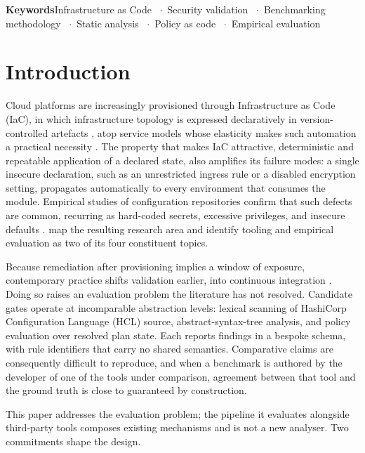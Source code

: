 \documentclass[smallextended]{svjour3}
\newcommand{\keywords}[1]{\par\smallskip\noindent\textbf{Keywords}\quad #1}
\providecommand{\and}{\unskip\ $\cdot$\ \ignorespaces}
\begin{document}
\keywords{Infrastructure as Code \and Security validation \and Benchmarking
methodology \and Static analysis \and Policy as code \and Empirical evaluation}

\section{Introduction}
\label{sec:intro}

Cloud platforms are increasingly provisioned through Infrastructure as Code
(IaC), in which infrastructure topology is expressed declaratively in
version-controlled artefacts \citep{morris2020infrastructure,
guerriero2019adoption}, atop service models whose elasticity makes such
automation a practical necessity \citep{armbrust2010view}. The property that
makes IaC attractive, deterministic and repeatable application of a declared
state, also amplifies its failure modes: a single insecure declaration, such as
an unrestricted ingress rule or a disabled encryption setting, propagates
automatically to every environment that consumes the module. Empirical studies of
configuration repositories confirm that such defects are common, recurring as
hard-coded secrets, excessive privileges, and insecure defaults
\citep{rahman2019sins, rahman2021replication, verdet2023exploring,
verdet2025adoption}. \citet{rahman2019mapping} map the resulting research area
and identify tooling and empirical evaluation as two of its four constituent
topics.

Because remediation after provisioning implies a window of exposure,
contemporary practice shifts validation earlier, into continuous integration
\citep{bass2015devops, humble2010continuous}. Doing so raises an evaluation
problem the literature has not resolved. Candidate gates operate at incomparable
abstraction levels: lexical scanning of HashiCorp Configuration Language (HCL) source, abstract-syntax-tree
analysis, and policy evaluation over resolved plan state. Each reports findings
in a bespoke schema, with rule identifiers that carry no shared semantics.
Comparative claims are consequently difficult to reproduce, and when a benchmark
is authored by the developer of one of the tools under comparison, agreement
between that tool and the ground truth is close to guaranteed by construction.

This paper addresses the evaluation problem; the pipeline it evaluates alongside
third-party tools composes existing mechanisms and is not a new analyser. Two commitments shape the design.
\end{document}
